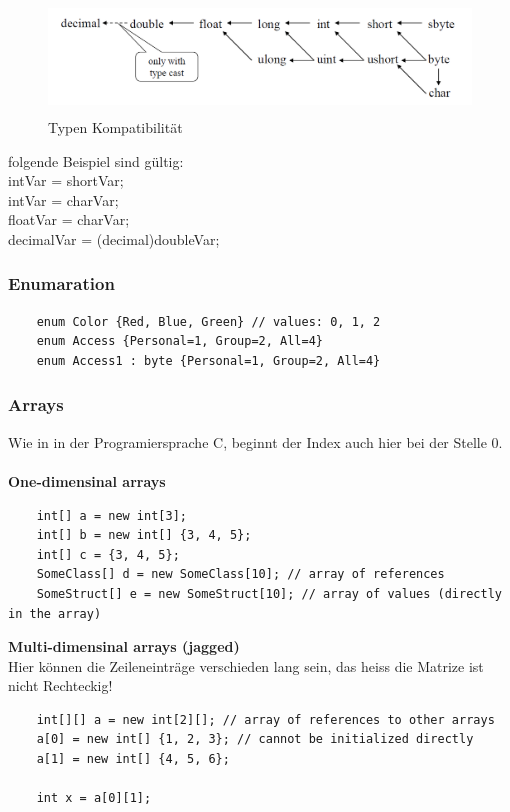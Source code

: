\begin{figure}[h]
	\centering
	\includegraphics[height=3cm, ]{images/CSharp/TypenKompatibilitaet}
	\caption{Typen Kompatibilität}
\end{figure}

folgende Beispiel sind gültig:\\

intVar = shortVar;\\
intVar = charVar;\\
floatVar = charVar;\\
decimalVar = (decimal)doubleVar;\\

\subsubsection{Enumaration}
\begin{lstlisting}
	enum Color {Red, Blue, Green} // values: 0, 1, 2
	enum Access {Personal=1, Group=2, All=4}
	enum Access1 : byte {Personal=1, Group=2, All=4}
\end{lstlisting}

\subsubsection{Arrays}
Wie in in der Programiersprache C, beginnt der Index auch hier bei der Stelle 0.\\ \\
\textbf{One-dimensinal arrays}
\begin{lstlisting}
	int[] a = new int[3];
	int[] b = new int[] {3, 4, 5};
	int[] c = {3, 4, 5};
	SomeClass[] d = new SomeClass[10]; // array of references
	SomeStruct[] e = new SomeStruct[10]; // array of values (directly in the array)
\end{lstlisting}

\textbf{Multi-dimensinal arrays (jagged)}\\
Hier können die Zeileneinträge verschieden lang sein, das heiss die Matrize ist nicht Rechteckig!
\begin{lstlisting}
	int[][] a = new int[2][]; // array of references to other arrays
	a[0] = new int[] {1, 2, 3}; // cannot be initialized directly
	a[1] = new int[] {4, 5, 6};
	
	int x = a[0][1];
\end{lstlisting}

